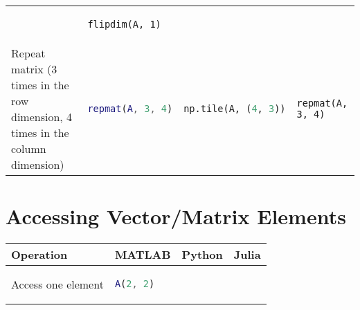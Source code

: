 \documentclass[10pt, landscape]{article}
\begin{document}
\begin{multicols}{2}
\begin{tabular}[]{@{}llll@{}}
\begin{minipage}[t]{0.20\columnwidth}
\end{minipage} & \begin{minipage}[t]{0.20\columnwidth}\raggedright
\begin{lstlisting}
flipdim(A, 1)
\end{lstlisting}

\end{minipage}\tabularnewline
\begin{minipage}[t]{0.24\columnwidth}\raggedright
Repeat matrix (3 times in the row dimension, 4 times in the column
dimension)
\end{minipage} & \begin{minipage}[t]{0.23\columnwidth}\raggedright
\begin{lstlisting}[language=Matlab]
repmat(A, 3, 4)
\end{lstlisting}

\end{minipage} & \begin{minipage}[t]{0.20\columnwidth}\raggedright
\begin{lstlisting}[language=Python]
np.tile(A, (4, 3))
\end{lstlisting}

\end{minipage} & \begin{minipage}[t]{0.20\columnwidth}\raggedright
\begin{lstlisting}
repmat(A, 3, 4)
\end{lstlisting}

\end{minipage}\tabularnewline
\bottomrule
\end{tabular}

\section{Accessing Vector/Matrix
Elements}\label{accessing-vectormatrix-elements}

\begin{tabular}[]{@{}llll@{}}
\toprule
\begin{minipage}[b]{0.23\columnwidth}\raggedright
Operation
\end{minipage} & \begin{minipage}[b]{0.23\columnwidth}\raggedright
MATLAB
\end{minipage} & \begin{minipage}[b]{0.23\columnwidth}\raggedright
Python
\end{minipage} & \begin{minipage}[b]{0.20\columnwidth}\raggedright
Julia
\end{minipage}\tabularnewline
\midrule
\begin{minipage}[t]{0.23\columnwidth}\raggedright
Access one element
\end{minipage} & \begin{minipage}[t]{0.23\columnwidth}\raggedright
\begin{lstlisting}[language=Matlab]
A(2, 2)
\end{lstlisting}


\end{minipage}
\end{tabular}
\end{multicols}
\end{document}
